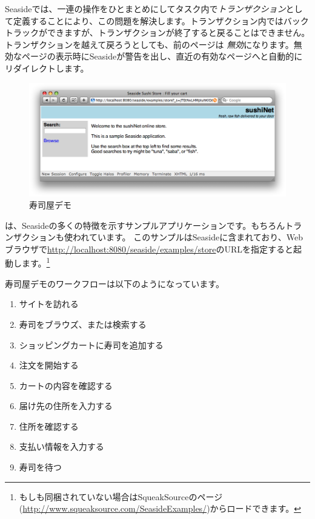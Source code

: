 \documentclass[a4paper,10pt,twoside]{book}
\begin{document}
Seasideでは、一連の操作をひとまとめにしてタスク内で\emph{トランザクション}として定義することにより、この問題を解決します。トランザクション内ではバックトラックができますが、トランザクションが終了すると戻ることはできません。トランザクションを越えて戻ろうとしても、前のページは \emph{無効}になります。無効なページの表示時にSeasideが警告を出し、直近の有効なページへと自動的にリダイレクトします。

\begin{figure}[ht]
\begin{center}
\includegraphics[width=\textwidth]{sushiStore}
\caption{寿司屋デモ}
\end{center}
\end{figure}

 は、Seasideの多くの特徴を示すサンプルアプリケーションです。もちろんトランザクションも使われています。
このサンプルはSeasideに含まれており、Webブラウザで\url{http://localhost:8080/seaside/examples/store}のURLを指定すると起動します。\footnote{もしも同梱されていない場合はSqueakSourceのページ(\url{http://www.squeaksource.com/SeasideExamples/})からロードできます。 }

寿司屋デモのワークフローは以下のようになっています。
\begin{enumerate}[itemsep=0pt]
  \item サイトを訪れる
  \item 寿司をブラウズ、または検索する
  \item ショッピングカートに寿司を追加する
  \item 注文を開始する
  \item カートの内容を確認する
  \item 届け先の住所を入力する
  \item 住所を確認する
  \item 支払い情報を入力する
  \item 寿司を待つ
\end{enumerate}
\end{document}
